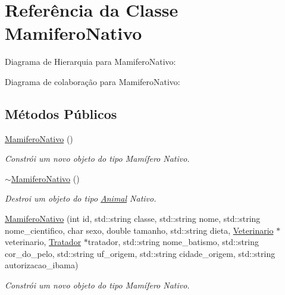 \hypertarget{classMamiferoNativo}{}\section{Referência da Classe Mamifero\+Nativo}
\label{classMamiferoNativo}


Diagrama de Hierarquia para Mamifero\+Nativo\+:


Diagrama de colaboração para Mamifero\+Nativo\+:
\subsection*{Métodos Públicos}
\begin{DoxyCompactItemize}
\item 
\mbox{\label{classMamiferoNativo_a6588fa54551bfa9df23749d2b2b00b05}} 
\hyperlink{classMamiferoNativo_a6588fa54551bfa9df23749d2b2b00b05}{Mamifero\+Nativo} ()
\begin{DoxyCompactList}\small\item\em Constrói um novo objeto do tipo Mamífero Nativo. \end{DoxyCompactList}\item 
\mbox{\label{classMamiferoNativo_aa08f523498d6713873a29747024e5717}} 
\hyperlink{classMamiferoNativo_aa08f523498d6713873a29747024e5717}{$\sim$\+Mamifero\+Nativo} ()
\begin{DoxyCompactList}\small\item\em Destroi um objeto do tipo \hyperlink{classAnimal}{Animal} Nativo. \end{DoxyCompactList}\item 
\hyperlink{classMamiferoNativo_a7c56682680010d93b58925b766afc798}{Mamifero\+Nativo} (int id, std\+::string classe, std\+::string nome, std\+::string nome\+\_\+cientifico, char sexo, double tamanho, std\+::string dieta, \hyperlink{classVeterinario}{Veterinario} $\ast$veterinario, \hyperlink{classTratador}{Tratador} $\ast$tratador, std\+::string nome\+\_\+batismo, std\+::string cor\+\_\+do\+\_\+pelo, std\+::string uf\+\_\+origem, std\+::string cidade\+\_\+origem, std\+::string autorizacao\+\_\+ibama)
\begin{DoxyCompactList}\small\item\em Constrói um novo objeto do tipo Mamífero Nativo. \end{DoxyCompactList}\item 

\end{DoxyCompactItemize}
